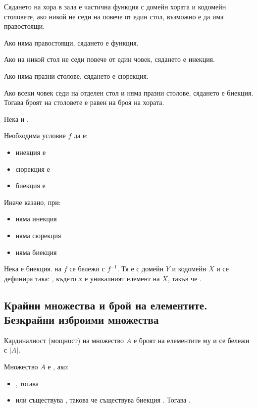 \begin{example}
    Сядането на хора в зала е частична функция с домейн хората и кодомейн столовете, ако никой не седи на 
    повече от един стол, възможно е да има правостоящи.
    
    Ако няма правостоящи, сядането е функция.

    Ако на никой стол не седи повече от един човек, сядането е инекция.

    Ако няма празни столове, сядането е сюрекция.

    Ако всеки човек седи на отделен стол и няма празни столове, сядането е биекция. Тогава броят на 
    столовете е равен на броя на хората.
\end{example}

Нека  и .

Необходима условие \(f\) да е:
\begin{itemize}
    \item инекция е 
    \item сюрекция е 
    \item биекция е 
\end{itemize}

Иначе казано, при:
\begin{itemize}
    \item {} няма инекция
    \item {} няма сюрекция
    \item {} няма биекция
\end{itemize}

\begin{definition}
    Нека  е биекция.
     на \(f\) се бележи с \(f^{-1}\). Тя е с домейн \(Y\) и кодомейн \(X\) и се 
    дефинира така: , където \(x\) е уникалният елемент на \(X\), такъв
    че .
\end{definition}

\subsection*{Крайни множества и брой на елементите. Безкрайни изброими множества}
Кардиналност (мощност) на множество \(A\) е броят на елементите му и се бележи с \(|A|\).

\begin{definition} 
    Множество \(A\) е , ако:
    \begin{itemize}
        \item {}, тогава 
        \item или съществува , такова че съществува биекция
        . Тогава .
    \end{itemize}
\end{definition}

